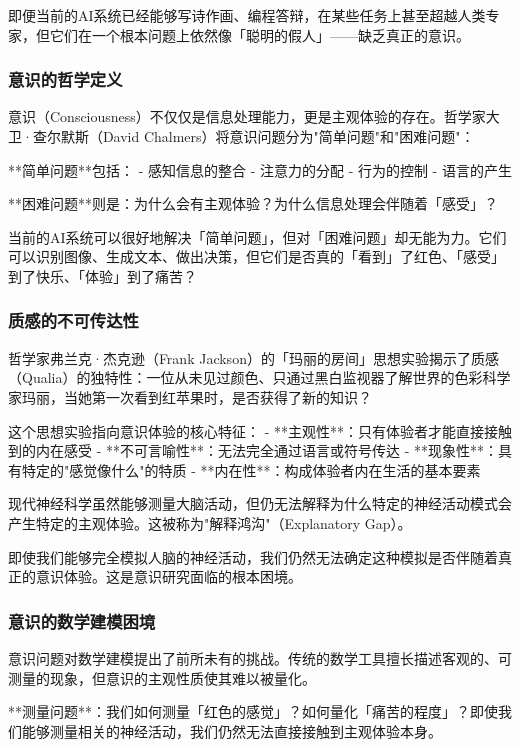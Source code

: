 即便当前的AI系统已经能够写诗作画、编程答辩，在某些任务上甚至超越人类专家，但它们在一个根本问题上依然像「聪明的假人」——缺乏真正的意识。

\subsubsection{意识的哲学定义}

意识（Consciousness）不仅仅是信息处理能力，更是主观体验的存在。哲学家大卫·查尔默斯（David Chalmers）将意识问题分为"简单问题"和"困难问题"：

**简单问题**包括：
- 感知信息的整合
- 注意力的分配
- 行为的控制
- 语言的产生

**困难问题**则是：为什么会有主观体验？为什么信息处理会伴随着「感受」？

当前的AI系统可以很好地解决「简单问题」，但对「困难问题」却无能为力。它们可以识别图像、生成文本、做出决策，但它们是否真的「看到」了红色、「感受」到了快乐、「体验」到了痛苦？

\subsubsection{质感的不可传达性}

哲学家弗兰克·杰克逊（Frank Jackson）的「玛丽的房间」思想实验揭示了质感（Qualia）的独特性：一位从未见过颜色、只通过黑白监视器了解世界的色彩科学家玛丽，当她第一次看到红苹果时，是否获得了新的知识？

这个思想实验指向意识体验的核心特征：
- **主观性**：只有体验者才能直接接触到的内在感受
- **不可言喻性**：无法完全通过语言或符号传达
- **现象性**：具有特定的"感觉像什么"的特质
- **内在性**：构成体验者内在生活的基本要素

现代神经科学虽然能够测量大脑活动，但仍无法解释为什么特定的神经活动模式会产生特定的主观体验。这被称为"解释鸿沟"（Explanatory Gap）。

\begin{center}
即使我们能够完全模拟人脑的神经活动，我们仍然无法确定这种模拟是否伴随着真正的意识体验。这是意识研究面临的根本困境。
\end{center}

\subsubsection{意识的数学建模困境}

意识问题对数学建模提出了前所未有的挑战。传统的数学工具擅长描述客观的、可测量的现象，但意识的主观性质使其难以被量化。

**测量问题**：我们如何测量「红色的感觉」？如何量化「痛苦的程度」？即使我们能够测量相关的神经活动，我们仍然无法直接接触到主观体验本身。

